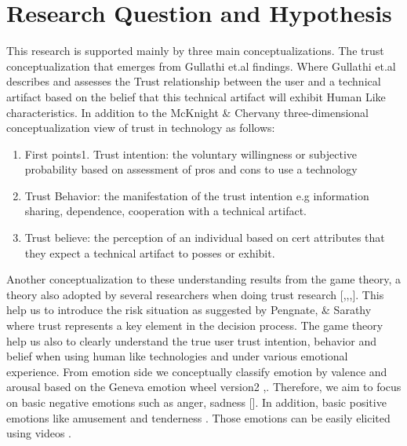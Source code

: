 \section{Research Question and Hypothesis}
This research is supported mainly by three main conceptualizations. The trust conceptualization that emerges from
Gullathi et.al \cite{gulati2017modelling:twentysix} findings. Where Gullathi et.al \cite{gulati2017modelling:twentysix} describes and assesses the Trust relationship between the user and a technical artifact based on the belief that this technical artifact will exhibit Human Like characteristics. In addition to the McKnight \& Chervany \cite{mcknight2001trust:fourteen} three-dimensional conceptualization view of trust in technology as follows:
\begin{enumerate}
    \item First points1.	Trust intention: the voluntary willingness or subjective probability based on assessment of pros and cons to use a technology
    \item Trust Behavior: the manifestation of the trust intention e.g information sharing, dependence, cooperation with a technical artifact.
    \item Trust believe: the perception of an individual based on cert attributes that they expect a technical artifact to posses or exhibit. 
\end{enumerate}
Another conceptualization to these understanding results from the game theory, a theory also adopted by several researchers when doing trust research [\cite{berg1995trust:thirtytwo},\cite{camerer1988experimental:thritythree},\cite{mccabe2003positive:thirtyfour},\cite{mccabe2000two:thirtyfive}]. This help us to introduce the  risk situation as suggested by Pengnate, \& Sarathy \cite{pengnate2017experimental:thirtyone} where trust represents a key element in the decision process.
The game theory help us also to clearly understand the true user trust intention, behavior and belief when using human like technologies and under various emotional experience. From emotion side we conceptually classify emotion by valence and arousal based on the Geneva emotion wheel version2  \cite{scherer2005emotions:thirtysix},\cite{scherer2013grid:thirtyseven}. Therefore, we aim to focus on basic negative emotions such as anger, sadness [\cite{ekman1984expression:thirtyeight}\cite{izard1991psychology:thirtynine}]. In addition, basic positive emotions like amusement and tenderness \cite{shaver1987emotion:fourty}. Those emotions can be easily elicited using videos \cite{schaefer2010assessing:foutyone}.
